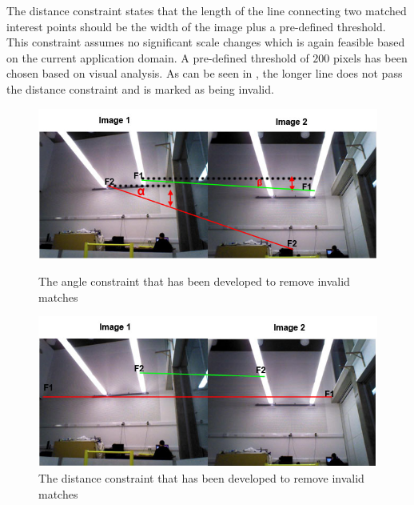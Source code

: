 The distance constraint states that the length of the line connecting two matched interest points should be the width of the image plus a pre-defined threshold. This constraint assumes no significant scale changes which is again feasible based on the current application domain. A pre-defined threshold of $200$ pixels has been chosen based on visual analysis. As can be seen in , the longer line does not pass the distance constraint and is marked as being invalid.\\

\begin{figure}[ht!]
\begin{minipage}[b]{0.5\linewidth}
  \centering
    \includegraphics[width=1.0\textwidth]{../Drawings/constraints/angleConstraintMerged.jpg}
    \caption{The angle constraint that has been developed to remove invalid matches} 
    \label{fig:angleConstraint}
\end{minipage}
\begin{minipage}[b]{0.5\linewidth}
  \centering
    \includegraphics[width=1.0\textwidth]{../Drawings/constraints/distanceConstraint.jpg}
    \caption{The distance constraint that has been developed to remove invalid matches} 
    \label{fig:distanceConstraint}
\end{minipage}
\end{figure}


